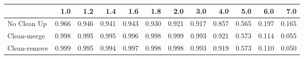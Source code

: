 \begin{tabular}{lrrrrrrrrrrr}
\toprule
{} &   1.0 &   1.2 &   1.4 &   1.6 &   1.8 &   2.0 &   3.0 &   4.0 &   5.0 &   6.0 &   7.0 \\
\midrule
No Clean Up  & 0.966 & 0.946 & 0.941 & 0.943 & 0.930 & 0.921 & 0.917 & 0.857 & 0.565 & 0.197 & 0.165 \\
Clean-merge  & 0.998 & 0.995 & 0.995 & 0.996 & 0.998 & 0.999 & 0.993 & 0.921 & 0.573 & 0.114 & 0.055 \\
Clean-remove & 0.999 & 0.995 & 0.994 & 0.997 & 0.998 & 0.998 & 0.993 & 0.919 & 0.573 & 0.110 & 0.050 \\
\bottomrule
\end{tabular}
